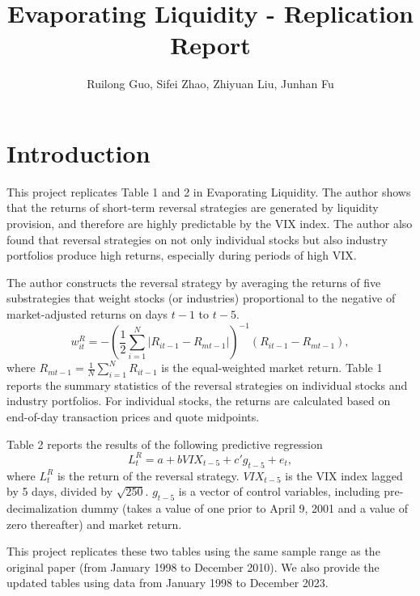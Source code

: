 \documentclass{article}
\begin{document}
\title{Evaporating Liquidity - Replication Report}

\author{
    Ruilong Guo,
    Sifei Zhao,
    Zhiyuan Liu,
    Junhan Fu
}


\maketitle


\section{Introduction}
This project replicates Table 1 and 2 in Evaporating Liquidity\cite{nagel}. The author
shows that the returns of short-term reversal strategies are generated by liquidity 
provision, and therefore are highly predictable by the VIX index. The author also 
found that reversal strategies on not only individual stocks but also industry portfolios 
produce high returns, especially during periods of high VIX.

The author constructs the reversal strategy by averaging the returns of five substrategies
that weight stocks (or industries) proportional to the negative of market-adjusted returns
on days $t-1$ to $t-5$.
\begin{equation}
    w_{it}^R = -\left( \frac{1}{2} \sum_{i=1}^{N} \left| R_{it-1} - R_{mt-1} \right| \right)^{-1} \left( R_{it-1} - R_{mt-1} \right),
\end{equation}
where $R_{mt-1} = \frac{1}{N}\sum_{i=1}^N R_{it-1}$ is the equal-weighted market return.
Table 1 reports the summary statistics of the reversal strategies on individual stocks 
and industry portfolios. For individual stocks, the returns are calculated based on 
end-of-day transaction prices and quote midpoints.

Table 2 reports the results of the following predictive regression
\begin{equation}
    L_t^R = a + bVIX_{t-5} + c'g_{t-5} + e_t,
\end{equation}
where $L_t^R$ is the return of the reversal strategy. $VIX_{t-5}$ is the VIX index lagged
by 5 days, divided by $\sqrt{250}$. $g_{t-5}$ is a vector of control variables, including 
pre-decimalization dummy (takes a value of one prior to April 9, 2001 and a value of zero 
thereafter) and market return.

This project replicates these two tables using the same sample range as the original
paper (from January 1998 to December 2010). We also provide the updated tables using
data from January 1998 to December 2023.
\end{document}
